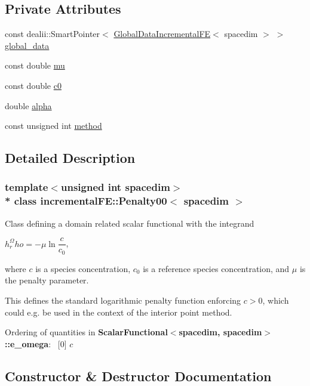 \subsection*{Private Attributes}
\begin{DoxyCompactItemize}
\item 
const dealii\+::\+Smart\+Pointer$<$ \hyperlink{classincremental_f_e_1_1_global_data_incremental_f_e}{Global\+Data\+Incremental\+FE}$<$ spacedim $>$ $>$ \hyperlink{classincremental_f_e_1_1_penalty00_a47da63117248061345d035043ec80b1f}{global\+\_\+data}
\item 
const double \hyperlink{classincremental_f_e_1_1_penalty00_a5b23dfd9218098c0f30884c4f1601716}{mu}
\item 
const double \hyperlink{classincremental_f_e_1_1_penalty00_a46894651008423818d058f782f2c95cd}{c0}
\item 
double \hyperlink{classincremental_f_e_1_1_penalty00_a347920b03b04ffdd4165f10dbceef2d0}{alpha}
\item 
const unsigned int \hyperlink{classincremental_f_e_1_1_penalty00_ac7ea7353834168a0cc76dbed74d4e947}{method}
\end{DoxyCompactItemize}


\subsection{Detailed Description}
\subsubsection*{template$<$unsigned int spacedim$>$\\*
class incremental\+F\+E\+::\+Penalty00$<$ spacedim $>$}

Class defining a domain related scalar functional with the integrand

$h^\Omega_rho = -\mu \ln\dfrac{c}{c_0}$,

where $c$ is a species concentration, $c_0$ is a reference species concentration, and $\mu$ is the penalty parameter.

This defines the standard logarithmic penalty function enforcing $c>0$, which could e.\+g. be used in the context of the interior point method.

Ordering of quantities in {\bf Scalar\+Functional$<$spacedim, spacedim$>$\+::e\+\_\+omega}\+:~\newline
 \mbox{[}0\mbox{]} $c$ 

\subsection{Constructor \& Destructor Documentation}
